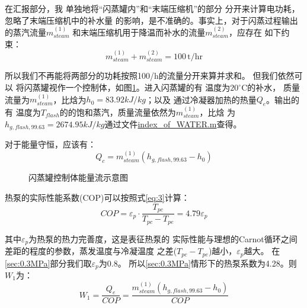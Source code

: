 \documentclass{thuemp}
\begin{document}
在汇报部分，我
单独地将“闪蒸罐内”和“末端压缩机”的部分
分开来计算电功耗，忽略了末端压缩机中的补水量
的影响，是不准确的。事实上，对于闪蒸过程输出的蒸汽流量$m_{steam}^{(1)}$
和末端压缩机用于降温而补水的流量$m_{steam}^{(2)}$，应存在
如下约束：
\begin{equation}\label{eq:1}
m_{steam}^{(1)} + m_{steam}^{(2)} = 100\,\mathrm{t/hr}
\end{equation}

所以我们不再能将两部分的功耗按照100/h的流量分开来算并求和。
但我们依然可以
将闪蒸罐视作一个控制体，如图\ref{fig:flash_energy}。进入闪蒸罐的有
温度为$20^\circ\mathrm{C}$的补水，
质量流量为$m_{steam}^{(1)}$，比焓为$h_0=83.92kJ/kg$；以及
通过冷凝器加热的热量$Q_e$。输出的有
温度为$T_{flash}$的的饱和蒸汽，质量流量依然为$m_{steam}^{(1)}$，比焓
为$h_{g,flash,99.63}=2674.95kJ/kg$通过文件\url{index_of_WATER.m}查得。

对于能量守恒，应该有：
\begin{equation}\label{eq:2}
    Q_c=m_{steam}^{(1)}(h_{g,flash,99.63}-h_0)
\end{equation}
\begin{figure}[H]
\centering
{}
\caption{闪蒸罐控制体能量流示意图}\label{fig:flash_energy}
\end{figure}
热泵的实际性能系数(COP)可以按照式\ref{eq:3}计算：
\begin{equation}\label{eq:3}
    COP=\varepsilon_p \cdot \frac{T_{pc}}{T_{pc}-T_{pe}}=4.79\varepsilon_p
\end{equation}

其中$\varepsilon_p$为热泵的热力完善度，这是表征热泵的
实际性能与理想的Carnot循环之间差距的程度的参数，蒸发温度与冷凝温度
之差($T_{pc}-T_{pe}$)越小，$\varepsilon_p$越大。
在\ref{sec:0.3MPa}部分我们取$\varepsilon_p$为0.8。
所以\ref{sec:0.3MPa}情形下的热泵系数为4.28。则$W_1$为：
\begin{equation}\label{eq:4}
    W_1=\frac{Q_e}{COP}=\frac{m_{steam}^{(1)}(h_{g,flash,99.63}-h_0)}{COP}
\end{equation}
\end{document}
